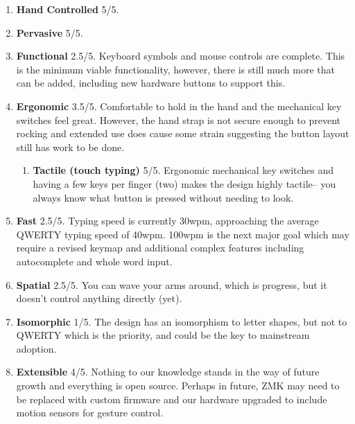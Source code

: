 \documentclass[logo,bsc,singlespacing,parskip]{infthesis}
\begin{document}
\begin{enumerate}
\item \textbf{Hand Controlled} 5/5.

\item \textbf{Pervasive} 5/5.

\item \textbf{Functional} 2.5/5. Keyboard symbols and mouse controls are complete.
This is the minimum viable functionality, however, there is still much more that can be added, including new hardware buttons to support this. \smallskip

\item \textbf{Ergonomic} 3.5/5. Comfortable to hold in the hand and the mechanical key switches feel great.
However, the hand strap is not secure enough to prevent rocking and extended use does cause some strain suggesting the button layout still has work to be done. \smallskip

\begin{enumerate}
\item \textbf{Tactile (touch typing)}  5/5. Ergonomic mechanical key switches and having a few keys per finger (two) makes the design highly tactile-- you always know what button is pressed without needing to look. \smallskip
\end{enumerate}

\item \textbf{Fast} 2.5/5. Typing speed is currently 30wpm, approaching the average QWERTY typing speed of 40wpm.
100wpm is the next major goal which may require a revised keymap and additional complex features including autocomplete and whole word input. \smallskip

\item \textbf{Spatial} 2.5/5. You can wave your arms around, which is progress, but it doesn't control anything directly (yet). \smallskip

\item \textbf{Isomorphic} 1/5. The design has an isomorphism to letter shapes, but not to QWERTY which is the priority, and could be the key to mainstream adoption. \smallskip

\item \textbf{Extensible} 4/5. Nothing to our knowledge stands in the way of future growth and everything is open source.
Perhaps in future, ZMK \autocite{ZMKFirmware} may need to be replaced with custom firmware and our hardware upgraded to include motion sensors for gesture control. \smallskip
\end{enumerate}
\end{document}

